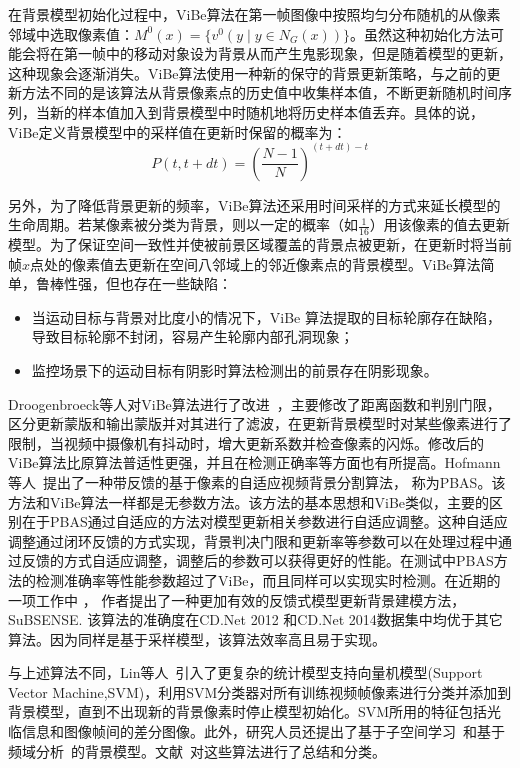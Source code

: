 在背景模型初始化过程中，ViBe算法在第一帧图像中按照均匀分布随机的从像素邻域中选取像素值：${M}^{0}(x)=\{v^{0}(y\mid y\in N_{G}(x))\}$。虽然这种初始化方法可能会将在第一帧中的移动对象设为背景从而产生鬼影现象，但是随着模型的更新，这种现象会逐渐消失。ViBe算法使用一种新的保守的背景更新策略，与之前的更新方法不同的是该算法从背景像素点的历史值中收集样本值，不断更新随机时间序列，当新的样本值加入到背景模型中时随机地将历史样本值丢弃。具体的说，ViBe定义背景模型中的采样值在更新时保留的概率为：
$$P(t,t+dt)={\left(\frac{N-1}{N} \right)}^{(t+dt)-t}$$ \par
另外，为了降低背景更新的频率，ViBe算法还采用时间采样的方式来延长模型的生命周期。若某像素被分类为背景，则以一定的概率（如$\frac{1}{16}$）用该像素的值去更新模型。为了保证空间一致性并使被前景区域覆盖的背景点被更新，在更新时将当前帧$x$点处的像素值去更新在空间八邻域上的邻近像素点的背景模型。ViBe算法简单，鲁棒性强，但也存在一些缺陷：
 \begin{itemize}
\item 当运动目标与背景对比度小的情况下，ViBe 算法提取的目标轮廓存在缺陷，导致目标轮廓不封闭，容易产生轮廓内部孔洞现象；
\item 监控场景下的运动目标有阴影时算法检测出的前景存在阴影现象。
\end{itemize}
\par
Droogenbroeck等人对ViBe算法进行了改进~\cite{vibe}，主要修改了距离函数和判别门限，区分更新蒙版和输出蒙版并对其进行了滤波，在更新背景模型时对某些像素进行了限制，当视频中摄像机有抖动时，增大更新系数并检查像素的闪烁。修改后的ViBe算法比原算法普适性更强，并且在检测正确率等方面也有所提高。Hofmann等人~\cite{pbas}提出了一种带反馈的基于像素的自适应视频背景分割算法， 称为PBAS。该方法和ViBe算法一样都是无参数方法。该方法的基本思想和ViBe类似，主要的区别在于PBAS通过自适应的方法对模型更新相关参数进行自适应调整。这种自适应调整通过闭环反馈的方式实现，背景判决门限和更新率等参数可以在处理过程中通过反馈的方式自适应调整，调整后的参数可以获得更好的性能。在测试中PBAS方法的检测准确率等性能参数超过了ViBe，而且同样可以实现实时检测。在近期的一项工作中 \cite{subsenseTIP}， 作者提出了一种更加有效的反馈式模型更新背景建模方法，SuBSENSE. 该算法的准确度在CD.Net 2012 和CD.Net 2014数据集中均优于其它算法。因为同样是基于采样模型，该算法效率高且易于实现。\par
与上述算法不同，Lin等人~\cite{lin2002a}引入了更复杂的统计模型支持向量机模型(Support Vector Machine,SVM)，利用SVM分类器对所有训练视频帧像素进行分类并添加到背景模型，直到不出现新的背景像素时停止模型初始化。SVM所用的特征包括光临信息和图像帧间的差分图像。此外，研究人员还提出了基于子空间学习~\cite{uray2007incremental}和基于频域分析~\cite{Gao2009}的背景模型。文献~\cite{BouwmansOverview}对这些算法进行了总结和分类。

